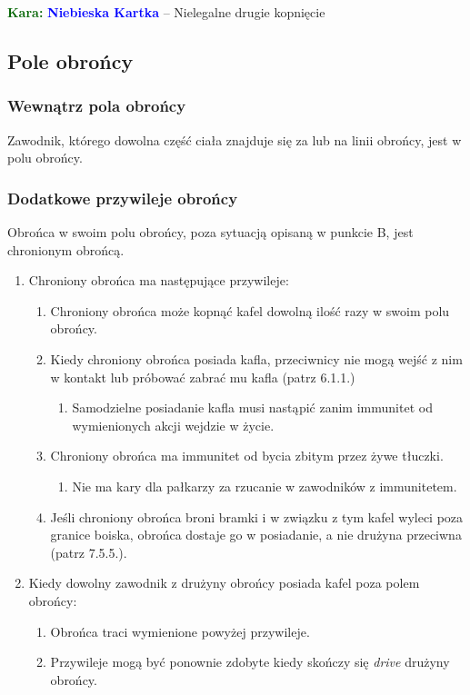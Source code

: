 \documentclass[11pt,a4paper]{article}
\newcommand\bluecard[1]{\bgroup\textcolor{darkgreen}{\textbf{Kara: }}\bgroup\textcolor{blue}{\textbf{Niebieska Kartka}} -- #1}
\begin{document}
\bluecard{Nielegalne drugie kopnięcie}

\subsection{Pole obrońcy}

\subsubsection{Wewnątrz pola obrońcy}
Zawodnik, którego dowolna część ciała znajduje się za lub na linii obrońcy, jest w polu obrońcy.

\subsubsection{Dodatkowe przywileje obrońcy}
Obrońca w swoim polu obrońcy, poza sytuacją opisaną w punkcie B, jest chronionym obrońcą.
\begin{enumerate}
  \item Chroniony obrońca ma następujące przywileje:
  \begin{enumerate}
    \item Chroniony obrońca może kopnąć kafel dowolną ilość razy w swoim polu obrońcy.
    \item Kiedy chroniony obrońca posiada kafla, przeciwnicy nie mogą wejść z nim w kontakt lub próbować zabrać mu kafla (patrz 6.1.1.) %
    \begin{enumerate}
      \item Samodzielne posiadanie kafla musi nastąpić zanim immunitet od wymienionych akcji wejdzie w życie.
    \end{enumerate}
    \item Chroniony obrońca ma immunitet od bycia zbitym przez żywe tłuczki.
    \begin{enumerate}
      \item Nie ma kary dla pałkarzy za rzucanie w zawodników z immunitetem.
    \end{enumerate}
    \item Jeśli chroniony obrońca broni bramki i w związku z tym kafel wyleci poza granice boiska, obrońca dostaje go w posiadanie, a nie drużyna przeciwna (patrz 7.5.5.). %
  \end{enumerate}
  \item Kiedy dowolny zawodnik z drużyny obrońcy posiada kafel poza polem obrońcy:
  \begin{enumerate}
    \item Obrońca traci wymienione powyżej przywileje.
    \item Przywileje mogą być ponownie zdobyte kiedy skończy się \emph{drive} drużyny obrońcy.
  \end{enumerate}
\end{enumerate}
\end{document}
